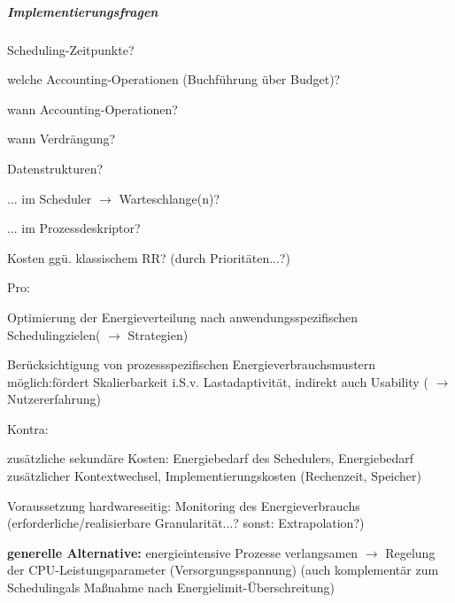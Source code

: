 \documentclass[a4paper]{article}
\begin{document}
\begin{multicols}{3}
    \subparagraph{Implementierungsfragen}
    \begin{itemize*}
        \item
        Scheduling-Zeitpunkte?
        \begin{itemize*}
            \item welche Accounting-Operationen (Buchführung über Budget)?
            \item wann Accounting-Operationen?
            \item wann Verdrängung?
        \end{itemize*}
        \item
        Datenstrukturen?
        \begin{itemize*}
            \item ... im Scheduler $\rightarrow$  Warteschlange(n)?
            \item ... im Prozessdeskriptor?
        \end{itemize*}
        \item
        Kosten ggü. klassischem RR? (durch Prioritäten...?)
        \item
        Pro:
        \begin{itemize*}
            \item Optimierung der Energieverteilung nach anwendungsspezifischen Schedulingzielen( $\rightarrow$  Strategien)
            \item Berücksichtigung von prozessspezifischen Energieverbrauchsmustern möglich:fördert Skalierbarkeit i.S.v. Lastadaptivität, indirekt auch Usability ( $\rightarrow$  Nutzererfahrung)
        \end{itemize*}
        \item
        Kontra:
        \begin{itemize*}
            \item zusätzliche sekundäre Kosten: Energiebedarf des Schedulers, Energiebedarf zusätzlicher Kontextwechsel, Implementierungskosten (Rechenzeit, Speicher)
            \item Voraussetzung hardwareseitig: Monitoring des Energieverbrauchs (erforderliche/realisierbare Granularität...? sonst: Extrapolation?)
        \end{itemize*}
        \item
        \textbf{generelle Alternative:} energieintensive Prozesse verlangsamen
        $\rightarrow$  Regelung der CPU-Leistungsparameter
        (Versorgungsspannung) (auch komplementär zum Schedulingals Maßnahme
        nach Energielimit-Überschreitung)

\end{itemize*}
\end{multicols}
\end{document}
